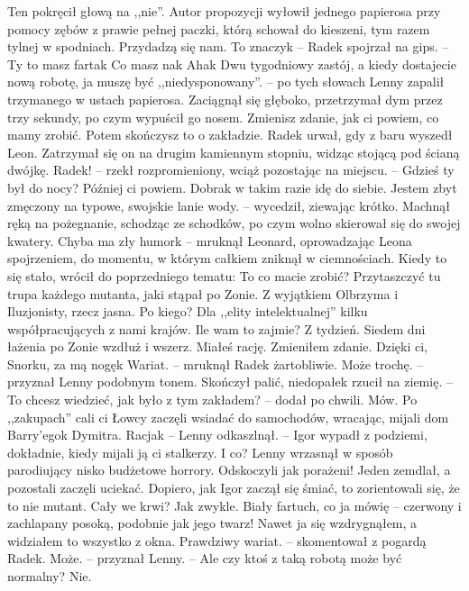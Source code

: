 \documentclass[../MAIN.tex]{subfiles}
\begin{document}
\qd
Ten pokręcił głową na ,,nie''. Autor propozycji wyłowił jednego papierosa przy pomocy zębów z prawie pełnej paczki, którą schował do kieszeni, tym razem tylnej w spodniach.
\sx Przydadzą się nam. To znaczy\3k -- Radek spojrzał na gips. -- Ty to masz farta\3k
\xx Co masz na\3k Aha\3k Dwu tygodniowy zastój, a kiedy dostajecie nową robotę, ja muszę być ,,niedysponowany''. -- po tych słowach Lenny zapalił trzymanego w ustach papierosa. Zaciągnął się głęboko, przetrzymał dym przez trzy sekundy, po czym wypuścił go nosem.
\xx Zmienisz zdanie, jak ci powiem, co mamy zrobić. Potem skończysz to o zakładzie.
\qd
Radek urwał, gdy z baru wyszedł Leon. Zatrzymał się on na drugim kamiennym stopniu, widząc stojącą pod ścianą dwójkę.
\sx Radek! -- rzekł rozpromieniony, wciąż pozostając na miejscu. -- Gdzieś ty był do nocy?
\xx Później ci powiem.
\xx Dobra\3k w takim razie idę do siebie. Jestem zbyt zmęczony na typowe, swojskie lanie wody. -- wycedził, ziewając krótko.
\qd
Machnął ręką na pożegnanie, schodząc ze schodków, po czym wolno skierował się do swojej kwatery.
\sx Chyba ma zły humor\3k -- mruknął Leonard, oprowadzając Leona spojrzeniem, do momentu, w którym całkiem zniknął w ciemnościach. Kiedy to się stało, wrócił do poprzedniego tematu:
\xx To co macie zrobić?
\xx Przytaszczyć tu trupa każdego mutanta, jaki stąpał po Zonie. Z wyjątkiem Olbrzyma i Iluzjonisty, rzecz jasna.
\xx Po kiego?
\xx Dla ,,elity intelektualnej'' kilku współpracujących z nami krajów.
\xx Ile wam to zajmie?
\xx Z tydzień. Siedem dni łażenia po Zonie wzdłuż i wszerz.
\xx Miałeś rację. Zmieniłem zdanie. Dzięki ci, Snorku, za mą nogę\3k
\xx Wariat. -- mruknął Radek żartobliwie.
\xx Może trochę. -- przyznał Lenny podobnym tonem. Skończył palić, niedopałek rzucił na ziemię. -- To chcesz wiedzieć, jak było z tym zakładem? -- dodał po chwili.
\xx Mów.
\xx Po ,,zakupach'' cali ci Łowcy zaczęli wsiadać do samochodów, wracając, mijali dom Barry’ego\3k
\xx Dymitra.
\xx Racja\3k -- Lenny odkaszlnął. -- Igor wypadł z podziemi, dokładnie, kiedy mijali ją ci stalkerzy.
\xx I co?
\qd
Lenny wrzasnął w sposób parodiujący nisko budżetowe horrory.
\sx Odskoczyli jak porażeni! Jeden zemdlał, a pozostali zaczęli uciekać. Dopiero, jak Igor zaczął się śmiać, to zorientowali się, że to nie mutant.
\xx Cały we krwi?
\xx Jak zwykle. Biały fartuch, co ja mówię -- czerwony i zachlapany posoką, podobnie jak jego twarz! Nawet ja się wzdrygnąłem, a widziałem to wszystko z okna.
\xx Prawdziwy wariat. -- skomentował z pogardą Radek.
\xx Może. -- przyznał Lenny. -- Ale czy ktoś z taką robotą może być normalny?
\xx Nie.
\qd
\end{document}
